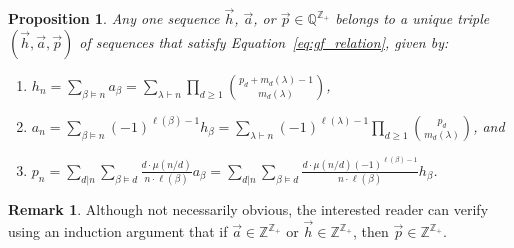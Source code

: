 \documentclass[11pt]{amsart}
\newtheorem{proposition}[theorem]{Proposition}
\theoremstyle{definition}
\newtheorem{remark}[theorem]{Remark}
\numberwithin{equation}{section}
\def\ZZ{{\mathbb Z}}
\def\QQ{{\mathbb Q}}
\begin{document}
\begin{proposition}
\label{prop:sequences}
Any one sequence $\vec{h}$, $\vec{a}$, or $\vec{p} \in \QQ^{\ZZ_+}$ belongs to a unique triple $(\vec{h}, \vec{a}, \vec{p})$ of sequences that satisfy Equation~\eqref{eq:gf_relation}, given by:
\begin{enumerate}[label = (\roman*), itemsep = 1em]
\item $\displaystyle h_{n}
= \sum_{\beta \vDash n} a_\beta
= \sum_{\lambda \vdash n} \prod_{d \geq 1} \binom{p_d + m_d(\lambda) -1}{m_d(\lambda)}$, 

\item $\displaystyle a_n
= \sum_{\beta \vDash n} (-1)^{\ell(\beta)-1} h_\beta
= \sum_{\lambda \vdash n} (-1)^{\ell(\lambda)-1} \prod_{d \geq 1} \binom{p_d}{m_d(\lambda)}$, and

\item $\displaystyle p_n
= \sum_{d|n} \sum_{\beta \vDash d} \frac{d\cdot \mu(n/d)}{n \cdot \ell(\beta)} a_\beta
= \sum_{d|n} \sum_{\beta \vDash d} \frac{d\cdot \mu(n/d) (-1)^{\ell(\beta)-1}}{n \cdot \ell(\beta)} h_\beta$.

\end{enumerate}
\end{proposition}


\begin{remark} Although not necessarily obvious, the interested reader can verify using an induction argument that if $\vec{a} \in \ZZ^{\ZZ_+}$ or $\vec{h} \in \ZZ^{\ZZ_+}$, then $\vec{p} \in \ZZ^{\ZZ_+}$.
\end{remark}
\end{document}
